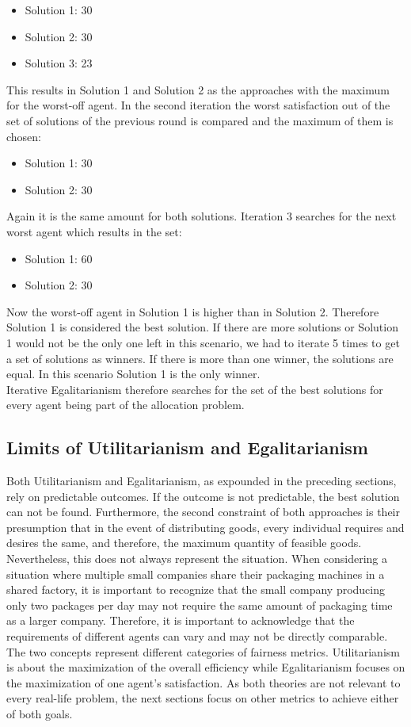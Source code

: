 \documentclass[german, a4paper, 11pt, oneside]{scrbook}
\begin{document}
\begin{itemize}
\item Solution 1: 30 
\item Solution 2: 30 
\item Solution 3: 23
\end{itemize}
This results in Solution 1 and Solution 2 as the approaches with the maximum for the worst-off agent. In the second iteration the worst satisfaction out of the set of solutions of the previous round is compared and the maximum of them is chosen:
\begin{itemize}
\item Solution 1: 30 
\item Solution 2: 30 
\end{itemize}
Again it is the same amount for both solutions. Iteration 3 searches for the next worst agent which results in the set:
\begin{itemize}
\item Solution 1: 60 
\item Solution 2: 30 
\end{itemize}
Now the worst-off agent in Solution 1 is higher than in Solution 2. Therefore Solution 1 is considered the best solution. If there are more solutions or Solution 1 would not be the only one left in this scenario, we had to iterate 5 times to get a set of solutions as winners. If there is more than one winner, the solutions are equal. In this scenario Solution 1 is the only winner. \\Iterative Egalitarianism therefore searches for the set of the best solutions for every agent being part of the allocation problem.

\subsection{Limits of Utilitarianism and Egalitarianism}
Both Utilitarianism and Egalitarianism, as expounded in the preceding sections, rely on predictable outcomes. If the outcome is not predictable, the best solution can not be found. Furthermore, the second constraint of both approaches is their presumption that in the event of distributing goods, every individual requires and desires the same, and therefore, the maximum quantity of feasible goods. \cite{Hooker,XinyingChen.2023,Bhavnani.2022b} Nevertheless, this does not always represent the situation. When considering a situation where multiple small companies share their packaging machines in a shared factory, it is important to recognize that the small company producing only two packages per day may not require the same amount of packaging time as a larger company. Therefore, it is important to acknowledge that the requirements of different agents can vary and may not be directly comparable. \\The two concepts represent different categories of fairness metrics. Utilitarianism is about the maximization of the overall efficiency while Egalitarianism focuses on the maximization of one agent's satisfaction. As both theories are not relevant to every real-life problem, the next sections focus on other metrics to achieve either of both goals.
\end{document}

